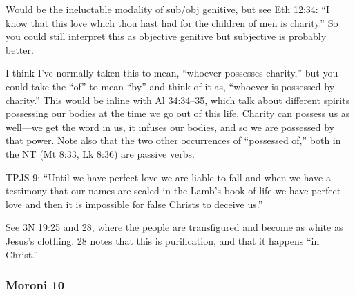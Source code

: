 \begin{compactdesc}
		\item[47$\vert$]
		\begin{compactdesc}
		\item[of Christ] Would be the ineluctable modality of sub/obj genitive, but see Eth 12:34: ``I know that this love which thou hast had for the children of men is charity.'' So you could still interpret this as objective genitive but subjective is probably better.
		\item[possessed of it] I think I've normally taken this to mean, ``whoever possesses charity,'' but you could take the ``of'' to mean ``by'' and think of it as, ``whoever is possessed by charity.'' This would be inline with Al 34:34--35, which talk about different spirits possessing our bodies at the time we go out of this life. Charity can possess us as well---we get the word in us, it infuses our bodies, and so we are possessed by that power. Note also that the two other occurrences of ``possessed of,'' both in the NT (Mt 8:33, Lk 8:36) are passive verbs.
		\end{compactdesc}
		
		\item[48$\vert$]
		\begin{compactdesc}
		\item[ye may be filled with this love] TPJS 9: ``Until we have perfect love we are liable to fall and when we have a testimony that our names are sealed in the Lamb's book of life we have perfect love and then it is impossible for false Christs to deceive us.''
		\item[we may be purified even as he is pure] See 3N 19:25 and 28, where the people are transfigured and become as white as Jesus's clothing. 28 notes that this is purification, and that it happens ``in Christ.''
		\end{compactdesc}
		
		\end{compactdesc}
		
	\subsubsection{Moroni 10} %
		
